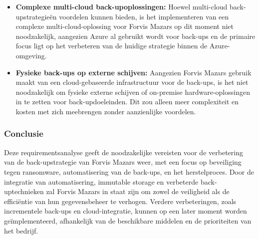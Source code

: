 \begin{itemize}
    \item \textbf{Complexe multi-cloud back-upoplossingen:} Hoewel multi-cloud back-upstrategieën voordelen kunnen bieden, is het implementeren van een complexe multi-cloud-oplossing voor Forvis Mazars op dit moment niet noodzakelijk, aangezien Azure al gebruikt wordt voor back-ups en de primaire focus ligt op het verbeteren van de huidige strategie binnen de Azure-omgeving.
    
    \item \textbf{Fysieke back-ups op externe schijven:} Aangezien Forvis Mazars gebruik maakt van een cloud-gebaseerde infrastructuur voor de back-ups, is het niet noodzakelijk om fysieke externe schijven of on-premise hardware-oplossingen in te zetten voor back-updoeleinden. Dit zou alleen meer complexiteit en kosten met zich meebrengen zonder aanzienlijke voordelen.
\end{itemize}

\subsubsection{Conclusie}
Deze requirementsanalyse geeft de noodzakelijke vereisten voor de verbetering van de back-upstrategie van Forvis Mazars weer, met een focus op beveiliging tegen ransomware, automatisering van de back-ups, en het herstelproces. Door de integratie van automatisering, immutable storage en verbeterde back-uptechnieken zal Forvis Mazars in staat zijn om zowel de veiligheid als de efficiëntie van hun gegevensbeheer te verhogen. Verdere verbeteringen, zoals incrementele back-ups en cloud-integratie, kunnen op een later moment worden geïmplementeerd, afhankelijk van de beschikbare middelen en de prioriteiten van het bedrijf.

